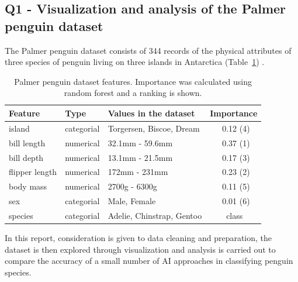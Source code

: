 \documentclass[a4paper, 11pt]{article}
\begin{document}
\begin{center}
  \subsection*{Q1 - Visualization and analysis of the Palmer penguin dataset}
\end{center}

\noindent
The Palmer penguin dataset consists of 344 records of the physical attributes of three species of penguin 
living on three islands in Antarctica (Table~\ref{tab:dataset}) \cite{PM}. 
\begin{table} %
  \small
  \begin{center}
  \vspace{-1.7\baselineskip} %
  \setlength{\abovecaptionskip}{5pt}
  \setlength{\belowcaptionskip}{5pt}
  \fontsize{10}{10}\selectfont %
  \begin{tabular}{l|l|l|l}
  \textbf{Feature}&\textbf{Type}&\textbf{Values in the dataset}&\textbf{Importance}\\
  \hline
  island&categorial&Torgersen, Biscoe, Dream&\ \ \ 0.12 (4)\\
  bill length&numerical&32.1mm - 59.6mm&\ \ \ 0.37 (1)\\
  bill depth&numerical&13.1mm - 21.5mm&\ \ \ 0.17 (3)\\
  flipper length&numerical&172mm - 231mm&\ \ \ 0.23 (2)\\
  body mass&numerical&2700g - 6300g&\ \ \ 0.11 (5)\\
  sex&categorial&Male, Female&\ \ \ 0.01 (6)\\
  species&categorial&Adelie, Chinstrap, Gentoo&\ \ \ \ class\\
  \end{tabular}
  \vspace{-2\baselineskip} %
  \end{center} 
  \caption{\centering\linespread{0.8}\selectfont Palmer penguin dataset features. Importance was calculated using random forest and a ranking is shown.}
  \vspace{-1\baselineskip} %
  \label{tab:dataset}
\end{table}
In this report, consideration is given to data cleaning and preparation, 
the dataset is then explored through visualization and analysis is carried out 
to compare the accuracy of a small number of AI approaches in classifying penguin species.
\end{document}

